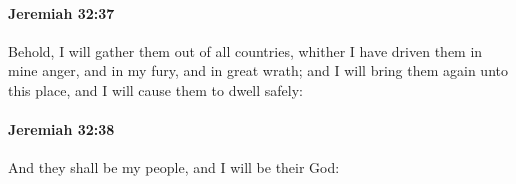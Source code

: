 		\paragraph{Jeremiah 32:37} %
			\label{JEREMIAH-32-37}

			Behold, I will gather them out of all countries, whither I have driven them in mine anger, and in my fury, and in great wrath; and I will bring them again unto this place, and I will cause them to dwell safely:


		\paragraph{Jeremiah 32:38} %
			\label{JEREMIAH-32-38}

			And they shall be my people, and I will be their God:



